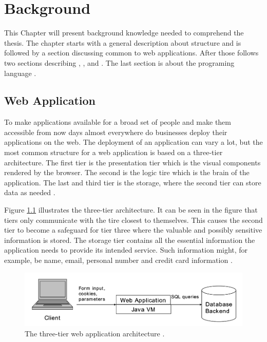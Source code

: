 \chapter{Background}

This Chapter will present background knowledge needed to comprehend the thesis. The chapter starts with a general description about \textit{} structure and is followed by a section discussing common \textit{} to web applications. After those follows two sections describing \textit{}, \textit{}, and \textit{}. The last section is about the programing language \textit{}.



\section{Web Application}
\label{WebApplication}
To make applications available for a broad set of people and make them accessible from now days almost everywhere do businesses deploy their applications on the web. The deployment of an application can vary a lot, but the most common structure for a web application is based on a three-tier architecture. The first tier is the presentation tier which is the visual components rendered by the browser. The second is the logic tire which is the brain of the application. The last and third tier is the storage, where the second tier can store data as needed \parencite{JustinClarke-Salt2009SIAa}.

Figure \ref{fig:webApplication-Haldar} illustrates the three-tier architecture. It can be seen in the figure that tiers only communicate with the tire closest to themselves. This causes the second tier to become a safeguard for tier three where the valuable and possibly sensitive information is stored. The storage tier contains all the essential information the application needs to provide its intended service. Such information might, for example, be name, email, personal number and credit card information \parencite{JustinClarke-Salt2009SIAa}.

\begin{figure}
  \centering
  \includegraphics[width=\textwidth]{images/webApplication-Haldar.png}
  \caption{The three-tier web application architecture \cite{Haldar}.}
  \label{fig:webApplication-Haldar}
\end{figure}

